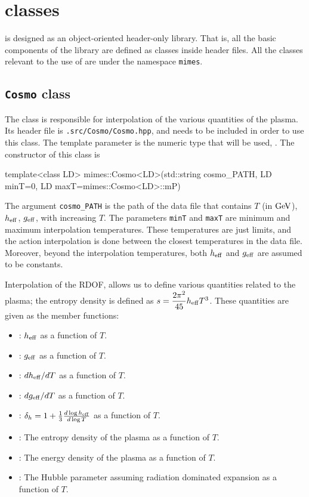 \documentclass[11pt,a4paper]{article}
\begin{document}
\section{\CPP classes}\label{app:classes}
\setcounter{equation}{0}
%
\mimes is designed as an object-oriented header-only library. That is, all the basic components of the library are defined as classes inside header files. All the classes relevant to the use of \mimes are under the namespace {\tt mimes}.

\subsection{{\tt Cosmo} class}
%
The  class is responsible for interpolation of the various quantities of the plasma. Its header file is {\tt \mimes.src/Cosmo/Cosmo.hpp}, and needs to be included in order to use this class. The template parameter  is the numeric type that will be used, \eg {}. The constructor of this class is
%
\begin{cpp}
	template<class LD>
	mimes::Cosmo<LD>(std::string cosmo_PATH, LD minT=0, LD maxT=mimes::Cosmo<LD>::mP)
\end{cpp}
%
The argument {\tt cosmo\_PATH} is the path of the data file that contains $T$ (in ${\rm GeV}$), $h_{\rm eff}{}$, $g_{\rm eff}{}$, with increasing $T$. The parameters {\tt minT} and {\tt maxT} are minimum and maximum interpolation temperatures. These temperatures are just limits, and the action interpolation is done between the closest temperatures in the data file. Moreover, beyond the interpolation temperatures, both $h_{\rm eff}{}$ and $g_{\rm eff}{}$ are assumed to be constants.   

Interpolation of the RDOF, allows us to define various quantities related to the plasma; \eg the entropy density is defined as $s = \dfrac{2\pi^2}{45} h_{\rm eff}{} T^3$. These quantities are given as the member functions:
%
\begin{itemize}
	\item {}: $h_{\rm eff}{}$ as a function of $T$.
	\item {}: $g_{\rm eff}{}$ as a function of $T$.
	\item {}: $dh_{\rm eff}{}/dT$ as a function of $T$.
	\item {}: $dg_{\rm eff}{}/dT$ as a function of $T$.
	\item {}: $\delta_h = 1 + \frac{1}{3} \frac{d\log h_{\rm eff}{}}{d\log T}$ as a function of $T$.
	\item {}: The entropy density of the plasma as a function of $T$.
	\item {}: The energy density of the plasma as a function of $T$.
	\item {}: The Hubble parameter assuming radiation dominated expansion as a function of $T$.
\end{itemize}
\end{document}
